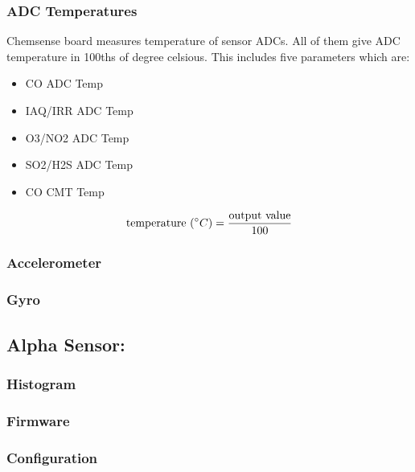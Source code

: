 \subsubsection{ ADC Temperatures}
Chemsense board measures temperature of sensor ADCs. All of them give ADC temperature in 100ths of degree celsious. This includes five parameters which are:
 
\begin{itemize}
  \item CO ADC Temp
  \item IAQ/IRR ADC Temp
  \item O3/NO2 ADC Temp
  \item SO2/H2S ADC Temp
  \item CO CMT Temp
\end{itemize}


{\centering 
 \[ \text{temperature }(\degree C) = \frac{\text{output value}}{100} \]
}

\subsubsection{ Accelerometer}

\subsubsection{ Gyro}

\subsection{Alpha Sensor:}
\subsubsection{ Histogram}

\subsubsection{ Firmware}

\subsubsection{ Configuration}